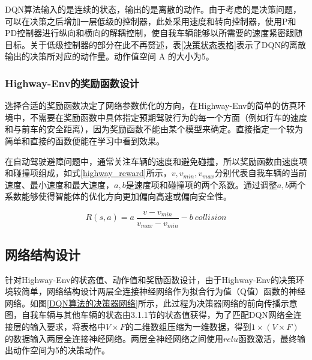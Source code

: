 DQN算法输入的是连续的状态，输出的是离散的动作。由于考虑的是决策问题，可以在决策之后增加一层低级的控制器，此处采用速度和转向控制器，使用P和PD控制器进行纵向和横向的解耦控制，使自我车辆能够以所需要的速度紧密跟随目标。关于低级控制器的部分在此不再赘述，表\ref{决策状态表格}表示了DQN的离散输出的决策所对应的动作量。动作值空间 A 的大小为5。

\begin{table}[htbp]
    \vspace{13pt} %
    \caption{决策状态表格}\label{决策状态表格}
    \centering
    \renewcommand\arraystretch{1.5}
\end{table}

\subsubsection{Highway-Env的奖励函数设计}

选择合适的奖励函数决定了网络参数优化的方向，在Highway-Env的简单的仿真环境中，不需要在奖励函数中具体指定预期驾驶行为的每一个方面（例如行车的速度和与前车的安全距离），因为奖励函数不能由某个模型来确定。直接指定一个较为简单和直接的函数便能在学习中看到效果。

在自动驾驶避障问题中，通常关注车辆的速度和避免碰撞，所以奖励函数由速度项和碰撞项组成，如式\ref{highway_reward}所示，$v,v_{min},v_{max}$分别代表自我车辆的当前速度、最小速度和最大速度，$a,b$是速度项和碰撞项的两个系数。通过调整$a,b$两个系数能够使得智能体的优化方向更加偏向高速或偏向安全性。

\begin{equation}\label{highway_reward}
    R(s,a) = a\ \frac{v-v_{min}}{v_{max} - v_{min}} - b\ collision
\end{equation}

\subsection{网络结构设计} %

针对Highway-Env的状态值、动作值和奖励函数设计，由于Highway-Env的决策环境较简单，网络结构设计两层全连接神经网络作为拟合行为值（Q值）函数的神经网络。如图\ref{DQN算法的决策器网络}所示，此过程为决策器网络的前向传播示意图，自我车辆与其他车辆的状态由3.1.1节的状态值获得，为了匹配DQN网络全连接层的输入要求，将表格中$V \times F$的二维数组压缩为一维数据，得到$1\times(V \times F)$的数据输入两层全连接神经网络。两层全神经网络之间使用$relu$函数激活，最终输出动作空间为5的决策动作。

